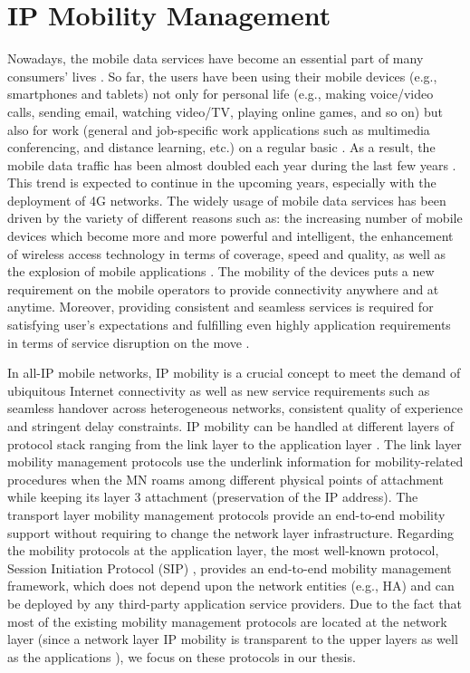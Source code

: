 \section{IP Mobility Management}\label{c1:IP_Mobility}

Nowadays, the mobile data services have become an essential part of many consumers' lives \cite{cisco_forecast,data_services}. 
So far, the users have been using their mobile devices (e.g., smartphones and tablets) not only for personal life (e.g., making voice/video calls, sending email, watching video/TV, playing online games, and so on) but also for work (general and job-specific work applications such as multimedia conferencing, and distance learning, etc.) on a regular basic \cite{cisco_service,morgan_stanley, mobile_2010}. As a result, the mobile data traffic has been almost doubled each year during the last few years \cite{ericsson}. This trend is expected to continue in the upcoming years, especially with the deployment of 4G networks. The widely usage of mobile data services has been driven by the variety of different reasons such as: the increasing number of mobile devices which become more and more powerful and intelligent, the enhancement of wireless access technology in terms of coverage, speed and quality, as well as the explosion of mobile applications \cite{ericsson}. The mobility of the devices puts a new requirement on the mobile operators to provide connectivity anywhere and at anytime. Moreover, providing consistent and seamless services is required for satisfying user's expectations and fulfilling even highly application requirements in terms of service disruption on the move \cite{seamless}. 

In all-IP mobile networks, IP mobility is a crucial concept to meet the demand of ubiquitous Internet connectivity as well as new service requirements such as seamless handover across heterogeneous networks, consistent quality of experience and stringent delay constraints. IP mobility can be handled at different layers of protocol stack ranging from the link layer to the application layer \cite{RFC6301, survey_mobility_management, mobility_handoff_management}. The link layer mobility management protocols use the underlink information for mobility-related procedures when the MN roams among different physical points of attachment while keeping its layer 3 attachment (preservation of the IP address). The transport layer mobility management protocols  \cite{transport_layer_snoeren, transport_layer_Atiquzzaman} provide an end-to-end mobility support without requiring to change the network layer infrastructure. Regarding the mobility protocols at the application layer, the most well-known protocol, Session Initiation Protocol (SIP) \cite{SIP_mobility,SIP_application_layer}, provides an end-to-end mobility management framework, which does not depend upon the network entities (e.g., HA) and can be deployed by any third-party application service providers. Due to the fact that most of the existing mobility management protocols are located at the network layer (since a network layer IP mobility is transparent to the upper layers as well as the applications \cite{L3_mobility_management, mobility_handoff_management}), we focus on these protocols in our thesis. 

